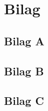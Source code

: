 \documentclass[12pt]{article}
\begin{document}
\section{Bilag}
\label{sec:bilag}

\subsection{Bilag A}
\label{sec:bilagA}

\subsection{Bilag B}
\label{sec:bilagB}

\subsection{Bilag C}
\label{sec:bilagC}
\end{document}
